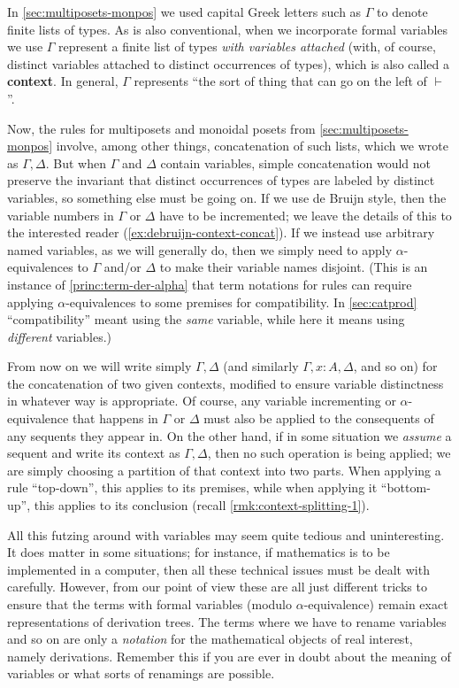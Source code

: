 \documentclass{book}
\let\types\vdash
\begin{document}
In \cref{sec:multiposets-monpos} we used capital Greek letters such as $\Gamma$ to denote finite lists of types.
As is also conventional, when we incorporate formal variables we use $\Gamma$ represent a finite list of types \emph{with variables attached} (with, of course, distinct variables attached to distinct occurrences of types), which is also called a \textbf{context}.
In general, $\Gamma$ represents ``the sort of thing that can go on the left of $\types$''.

Now, the rules for multiposets and monoidal posets from \cref{sec:multiposets-monpos} involve, among other things, concatenation of such lists, which we wrote as $\Gamma,\Delta$.
But when $\Gamma$ and $\Delta$ contain variables, simple concatenation would not preserve the invariant that distinct occurrences of types are labeled by distinct variables, so something else must be going on.
If we use de Bruijn style, then the variable numbers in $\Gamma$ or $\Delta$ have to be incremented; we leave the details of this to the interested reader (\cref{ex:debruijn-context-concat}).
If we instead use arbitrary named variables, as we will generally do, then we simply need to apply $\alpha$-equivalences to $\Gamma$ and/or $\Delta$ to make their variable names disjoint.
(This is an instance of \cref{princ:term-der-alpha} that term notations for rules can require applying $\alpha$-equivalences to some premises for compatibility.
In \cref{sec:catprod} ``compatibility'' meant using the \emph{same} variable, while here it means using \emph{different} variables.)

From now on we will write simply $\Gamma,\Delta$ (and similarly $\Gamma, x:A, \Delta$, and so on) for the concatenation of two given contexts, modified to ensure variable distinctness in whatever way is appropriate.
Of course, any variable incrementing or $\alpha$-equivalence that happens in $\Gamma$ or $\Delta$ must also be applied to the consequents of any sequents they appear in.
On the other hand, if in some situation we \emph{assume} a sequent and write its context as $\Gamma,\Delta$, then no such operation is being applied; we are simply choosing a partition of that context into two parts.
When applying a rule ``top-down'', this applies to its premises, while when applying it ``bottom-up'', this applies to its conclusion (recall \cref{rmk:context-splitting-1}).

All this futzing around with variables may seem quite tedious and uninteresting.
It does matter in some situations; for instance, if mathematics is to be implemented in a computer, then all these technical issues must be dealt with carefully.
However, from our point of view these are all just different tricks to ensure that the terms with formal variables (modulo $\alpha$-equivalence) remain exact representations of derivation trees.
The terms where we have to rename variables and so on are only a \emph{notation} for the mathematical objects of real interest, namely derivations.
Remember this if you are ever in doubt about the meaning of variables or what sorts of renamings are possible.
\end{document}
